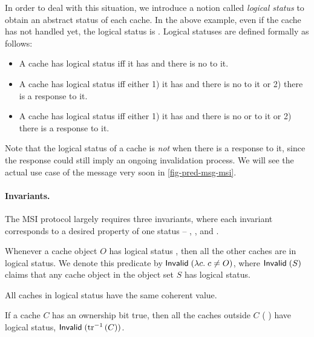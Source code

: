 In order to deal with this situation, we introduce a notion called \emph{logical status} to obtain an abstract status of each cache.
In the above example, even if the cache has not handled  yet, the logical status is \stI{}.
Logical statuses are defined formally as follows:
\begin{itemize}
\item A cache has logical status \stM{} iff it has \stM{} and there is no  to it.
\item A cache has logical status \stS{} iff either 1) it has \stS{} and there is no  to it or 2) there is a response  to it.
\item A cache has logical status \stI{} iff either 1) it has \stI{} and there is no  or  to it or 2) there is a response  to it.
\end{itemize}
Note that the logical status of a cache is \emph{not} \stM{} when there is a response  to it, since the response could still imply an ongoing invalidation process.
We will see the actual use case of the  message very soon in \autoref{fig-pred-msg-msi}.

\paragraph{Invariants.}
The MSI protocol largely requires three invariants, where each invariant corresponds to a desired property of one status -- \stM{}, \stS{}, and \stI{}.

\begin{invariant}
  \label{inv-excl}
  Whenever a cache object $O$ has logical status \stM{}, then all the other caches are in logical \stI{} status.
  We denote this predicate by $\textsf{Invalid}\;(\lambda c.\; c \neq O)$, where $\textsf{Invalid}\;(S)$ claims that any cache object in the object set $S$ has logical \stI{} status.
\end{invariant}

\begin{invariant}
  \label{inv-sharing}
  All caches in logical \stS{} status have the same coherent value.
\end{invariant}

\begin{invariant}
  \label{inv-inv-ownership}
  If a cache $C$ has an ownership bit true, then all the caches outside $C$ (\ie{} ) have logical \stI{} status, \ie{} $\textsf{Invalid}\;(\textrm{tr}^{-1}\,(C))$.
\end{invariant}

